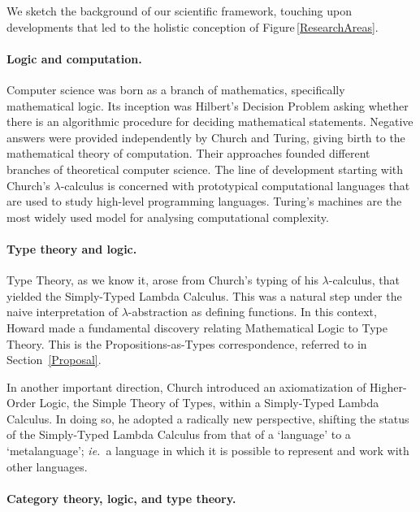 \documentclass[11pt,twocolumn]{article}
\newcommand{\ie}{\emph{ie.}}
\newcommand{\lcalculus}{\mbox{$\lambda$-calculus}}
\begin{document}
We sketch the background of our scientific framework, 
touching upon %
developments that led to the holistic conception of
Figure\,\ref{ResearchAreas}.


\paragraph*{Logic and computation.}

Computer science was born as a branch of mathematics, specifically
mathematical logic.  Its inception was Hilbert's %
Decision Problem asking whether there is an algorithmic procedure for
deciding mathematical statements.  Negative answers were provided
independently by Church %
and Turing, %
giving birth to the mathematical theory of computation.  Their approaches
founded different branches of theoretical computer science.  
The %
line of development starting with Church's {\lcalculus} %
is concerned with prototypical computational languages that are used to study
high-level programming languages.  
Turing's machines %
are the most widely used model for analysing computational complexity.

\paragraph*{Type theory and logic.}
\label{SectionATypeTheoryAndLogicParagraph}

Type Theory, as we %
know it, arose from Church's typing of
his \lcalculus, that yielded the 
Simply-Typed Lambda Calculus. %
This was a natural step under the naive interpretation of
\mbox{$\lambda$-abstraction} as defining functions.  In this
context,
Howard %
made a fundamental discovery relating Mathematical Logic to Type Theory.
This is the Prop\-o\-si\-tions-as-Types correspondence, referred to
in Section~\ref{Proposal}.

In another %
important direction, Church introduced 
an axiomatization of Higher-Order Logic, the 
Simple Theory of Types, %
within a Simply-Typed Lambda Calculus.  In doing so, he adopted a
radically new perspective, shifting the status of the Simply-Typed Lambda
Calculus from that of a `language' to a `metalanguage'; \ie~a language in
which it is possible to represent and work with other languages. 

\paragraph*{Category theory, logic, and type theory.}
\end{document}
